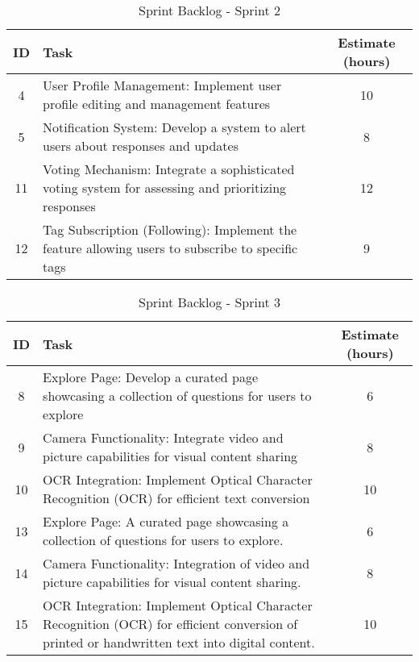 \begin{table}[h]
    \centering
    \caption*{Sprint Backlog - Sprint 2}
    \begin{tabular}{|c|p{5cm}|c|}
        \hline
        \textbf{ID} & \textbf{Task} & \textbf{Estimate (hours)} \\
        \hline
        4 & User Profile Management: Implement user profile editing and management features & 10 \\
        \hline
        5 & Notification System: Develop a system to alert users about responses and updates & 8 \\
        \hline
        11 & Voting Mechanism: Integrate a sophisticated voting system for assessing and prioritizing responses & 12 \\
        \hline
        12 & Tag Subscription (Following): Implement the feature allowing users to subscribe to specific tags & 9 \\
        \hline
    \end{tabular}
\end{table}

\begin{table}[h]
    \centering
    \caption*{Sprint Backlog - Sprint 3}
    \begin{tabular}{|c|p{5cm}|c|}
        \hline
        \textbf{ID} & \textbf{Task} & \textbf{Estimate (hours)} \\
        \hline
        8 & Explore Page: Develop a curated page showcasing a collection of questions for users to explore & 6 \\
        \hline
        9 & Camera Functionality: Integrate video and picture capabilities for visual content sharing & 8 \\
        \hline
        10 & OCR Integration: Implement Optical Character Recognition (OCR) for efficient text conversion & 10 \\
        \hline
        13 & Explore Page: A curated page showcasing a collection of questions for users to explore. & 6 \\
        \hline
        14 & Camera Functionality: Integration of video and picture capabilities for visual content sharing. & 8 \\
        \hline
        15 & OCR Integration: Implement Optical Character Recognition (OCR) for efficient conversion of printed or handwritten text into digital content. & 10 \\
        \hline
    \end{tabular}
\end{table}



